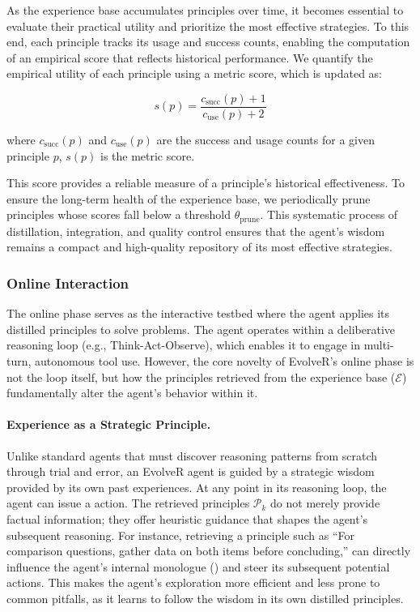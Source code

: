 As the experience base accumulates principles over time, it becomes essential to evaluate their practical utility and prioritize the most effective strategies. To this end, each principle tracks its usage and success counts, enabling the computation of an empirical score that reflects historical performance.
We quantify the empirical utility of each principle using a metric score, which is updated as:

\begin{equation}
s(p) = \frac{c_{\text{succ}}(p) + 1}{c_{\text{use}}(p) + 2}
\label{eq:laplace_smoothing}
\end{equation}


where $c_{\text{succ}}(p)$ and $c_{\text{use}}(p)$ are the success and usage counts for a given principle $p$, $s(p)$ is the metric score.

This score provides a reliable measure of a principle's historical effectiveness. To ensure the long-term health of the experience base, we periodically prune principles whose scores fall below a threshold $\theta_{\text{prune}}$. This systematic process of distillation, integration, and quality control ensures that the agent's wisdom remains a compact and high-quality repository of its most effective strategies.


\subsubsection{Online Interaction}

The online phase serves as the interactive testbed where the agent applies its distilled principles to solve problems. The agent operates within a deliberative reasoning loop (e.g., Think-Act-Observe), which enables it to engage in multi-turn, autonomous tool use. However, the core novelty of EvolveR's online phase is not the loop itself, but how the principles retrieved from the experience base ($\mathcal{E}$) fundamentally alter the agent's behavior within it.


\paragraph{Experience as a Strategic Principle.}
Unlike standard agents that must discover reasoning patterns from scratch through trial and error, an EvolveR agent is guided by a strategic wisdom provided by its own past experiences. At any point in its reasoning loop, the agent can issue a  action. The retrieved principles $\mathcal{P}_k$ do not merely provide factual information; they offer heuristic guidance that shapes the agent's subsequent reasoning. For instance, retrieving a principle such as ``For comparison questions, gather data on both items before concluding,'' can directly influence the agent's internal monologue () and steer its subsequent potential  actions. This makes the agent's exploration more efficient and less prone to common pitfalls, as it learns to follow the wisdom in its own distilled principles.


